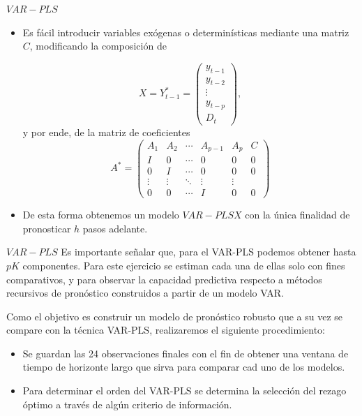 \documentclass{beamer}
\newcommand{\?}{?`}
\begin{document}
\begin{frame}{$VAR-PLS$}
  \begin{itemize}
  \item Es f\'acil introducir variables ex\'ogenas o determin\'isticas
    mediante una matriz $C$, modificando la composici\'on de 
    \begin{footnotesize}
    \begin{displaymath}
      X=Y_{t-1}^{*}=\left(
        \begin{array}{c}
          y_{t-1} \\
          y_{t-2} \\
          \vdots \\
          y_{t-p} \\
          D_t
        \end{array}
      \right), 
    \end{displaymath}
    y por ende, de la matriz de coeficientes
    \begin{displaymath}
      A^{*}=\left(
        \begin{array}{cccccc}
          A_1 & A_2 & \cdots & A_{p-1} & A_p & C \\
          I & 0 & \cdots & 0 & 0 & 0 \\
          0 & I & \cdots & 0 & 0 & 0 \\
          \vdots & \vdots & \ddots & \vdots & \vdots \\
          0 & 0 & \cdots & I & 0 & 0
        \end{array}
        \right)
    \end{displaymath}
    \end{footnotesize}
  \item De esta forma obtenemos un modelo $VAR-PLSX$ con la \'unica
    finalidad de pronosticar $h$ pasos adelante.
  \end{itemize}
\end{frame}

\begin{frame}{$VAR-PLS$}
  Es importante se\~nalar que, para el VAR-PLS podemos obtener hasta
  $pK$ componentes. Para este ejercicio se estiman cada una de ellas
  solo con fines comparativos, y para observar la capacidad predictiva
  respecto a m\'etodos recursivos de pron\'ostico construidos a partir
  de un modelo VAR.
  \medskip
  
  Como el objetivo es construir un modelo de pron\'ostico robusto que
  a su vez se compare con la t\'ecnica VAR-PLS, realizaremos el
  siguiente procedimiento:
  \begin{itemize}
  \item Se guardan las 24 observaciones finales con el fin de obtener
    una ventana de tiempo de horizonte largo que sirva para comparar
    cad uno de los modelos.
  \item Para determinar el orden del VAR-PLS se determina la
    selecci\'on del rezago \'optimo a trav\'es de alg\'un criterio de
    informaci\'on.
  \end{itemize}
\end{frame}
\end{document}
